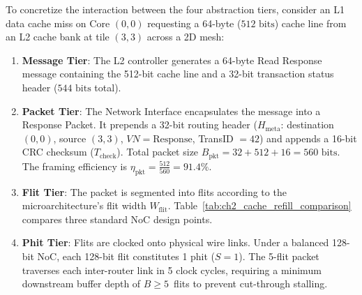 To concretize the interaction between the four abstraction tiers, consider an L1 data cache miss on Core $(0, 0)$ requesting a 64-byte ($512\text{ bits}$) cache line from an L2 cache bank at tile $(3, 3)$ across a 2D mesh:
\begin{enumerate}
    \item \textbf{Message Tier}: The L2 controller generates a 64-byte Read Response message containing the 512-bit cache line and a 32-bit transaction status header ($544\text{ bits}$ total).
    \item \textbf{Packet Tier}: The Network Interface encapsulates the message into a Response Packet. It prepends a 32-bit routing header ($H_{\text{meta}}$: destination $(0,0)$, source $(3,3)$, $VN = \text{Response}$, TransID $= 42$) and appends a 16-bit CRC checksum ($T_{\text{check}}$). Total packet size $B_{\text{pkt}} = 32 + 512 + 16 = 560\text{ bits}$. The framing efficiency is $\eta_{\text{pkt}} = \frac{512}{560} = 91.4\%$.
    \item \textbf{Flit Tier}: The packet is segmented into flits according to the microarchitecture's flit width $W_{\text{flit}}$. Table~\ref{tab:ch2_cache_refill_comparison} compares three standard NoC design points.
    \item \textbf{Phit Tier}: Flits are clocked onto physical wire links. Under a balanced 128-bit NoC, each 128-bit flit constitutes 1 phit ($S = 1$). The 5-flit packet traverses each inter-router link in 5 clock cycles, requiring a minimum downstream buffer depth of $B \ge 5$~flits to prevent cut-through stalling.
\end{enumerate}

